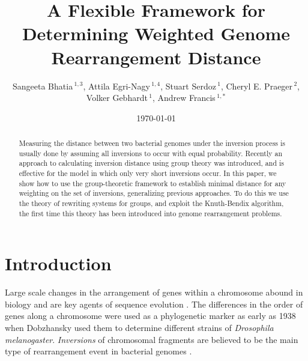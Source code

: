 \documentclass[utf8]{Frontiers_LaTex_Templates/frontiersFPHY} %
\numberwithin{equation}{section}
\def\firstAuthorLast{Bhatia {et~al.}}
\def\Authors{Sangeeta Bhatia\,$^{1,3}$, Attila Egri-Nagy\,$^{1,4}$, Stuart Serdoz\,$^{1}$, Cheryl E. Praeger\,$^{2}$, Volker Gebhardt\,$^{1}$, Andrew Francis\,$^{1,*}$}
\begin{document}
\onecolumn
{}

\title[Weighted Genome Rearrangement Distance]{A Flexible Framework for Determining Weighted Genome Rearrangement Distance}

\author[\firstAuthorLast ]{\Authors} %
\address{} %
\correspondance{} %

\extraAuth{}%

\maketitle




\begin{abstract}
Measuring the distance between two bacterial genomes under the inversion process is usually done by assuming all inversions to occur with equal probability.  Recently an approach to calculating inversion distance using group theory was introduced, and is effective for the model in which only very short inversions occur.  In this paper, we show how to use the group-theoretic framework to establish minimal distance for any weighting on the set of inversions, generalizing previous approaches.  To do this we use the theory of rewriting systems for groups, and exploit the Knuth-Bendix algorithm, the first time this theory has been introduced into genome rearrangement problems.
\end{abstract}
\date{\today}


\section{Introduction}
\label{sec:intro}

Large scale changes in the arrangement of genes within a chromosome abound in biology and are key agents of sequence evolution \citep{beckmann2007copy,belda2005genome}. The differences in the order of genes along a chromosome were used as a phylogenetic marker as early as 1938~\citep{dobzhansky1938inversions} when Dobzhansky used them to determine different strains of \emph{Drosophila melanogaster}. \emph{Inversions} of chromosomal fragments are believed to be the main type of rearrangement event in bacterial genomes \citep{Belda2005}.  
\end{document}
